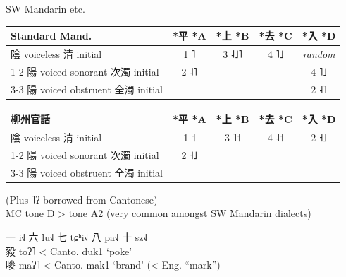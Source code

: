 \documentclass{beamer}
\begin{document}
\begin{frame}[fragile]{SW Mandarin etc.}

\begin{tabular}{l||c|c|c||c}
    \hline
    Standard Mand. & *平 *A & *上 *B & *去 *C & *入 *D\\\hline
    陰 {\tiny *voiceless 清 initial} & 1 ˥ & 3 ˨˩˥ & 4 ˥˩ & \textit{\footnotesize random}\\ \cline{1-2} \cline{5-5} 
    陽 {\tiny *voiced sonorant 次濁 initial} & 2 ˨˥ & & & 4 ˥˩\\ \cline{3-3} \cline{5-5}
    陽 {\tiny *voiced obstruent 全濁 initial} & & \multicolumn{1}{|l}{} & & 2 ˨˥\\ \hline
\end{tabular}

\bigskip
\begin{tabular}{l||c|c|c||c}
    \hline
    柳州官話 & *平 *A & *上 *B & *去 *C & *入 *D\\\hline
    陰 {\tiny *voiceless 清 initial} & 1 ˦ & 3 ˥˦ & 4 ˨˦ & 2 ˧˩\\ \cline{1-2} 
    陽 {\tiny *voiced sonorant 次濁 initial} & 2 ˧˩ & & & \\ \cline{3-3}
    陽 {\tiny *voiced obstruent 全濁 initial} & & \multicolumn{1}{|l}{} & & \\ \hline
\end{tabular}
{\footnotesize (Plus ˥ʔ borrowed from Cantonese)}\\
MC tone D > tone A2 {\footnotesize (very common amongst SW Mandarin dialects)}

\bigskip
一 i˧˩ 六 lu˧˩ 七 tɕʰi˧˩ 八 pa˧˩ 十 sz˧˩\\
豛 toʔ˥ < Canto. duk1 \enquote*{poke}\\
嘜 maʔ˥ < Canto. mak1 \enquote*{brand} (< Eng. \enquote{mark})\\

\end{frame}
\end{document}
